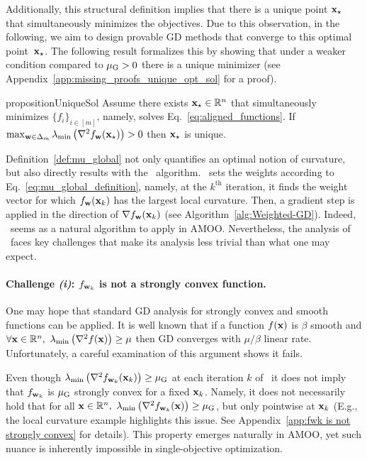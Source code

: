 Additionally, this structural definition implies that there is a unique point ${\mathbf{x}}_\star$ that simultaneously minimizes the objectives. Due to this observation, in the following, we aim to design provable GD methods that converge to this optimal point~${\mathbf{x}}_\star$. The following result formalizes this by showing that under a weaker condition compared to ${\mu_{\mathrm{G}}}>0$ there is a unique minimizer (see Appendix~\ref{app:missing_proofs_unique_opt_sol}  for a proof).

\begin{restatable}{proposition}{UniqueSol}\label{prop:unique_optimal_sol} Assume there exists ${\mathbf{x}}_\star\in \mathbb{R}^n$ that simultaneously minimizes $\{f_i \}_{i\in [m]}$, namely, solves Eq.~\eqref{eq:aligned_functions}. If $\max_{{\mathbf{w}}\in \Delta_m}\lambda_{\min}\left(\nabla^2 f_{{\mathbf{w}}}({\mathbf{x}}_\star) \right)>0$ then ${\mathbf{x}}_\star$ is unique.
\end{restatable}


Definition~\ref{def:mu_global} not only quantifies an optimal notion of curvature, but also directly results with the \CAMOO\ algorithm. \CAMOO\ sets the weights according to Eq.~\eqref{eq:mu_global_definition}, namely, at the $k^{\mathrm{th}}$ iteration, it finds the weight vector for which $f_{\mathbf{w}}({\mathbf{x}}_k)$ has the largest local curvature. Then, a gradient step is applied in the direction of $\nabla f_{{\mathbf{w}}}({\mathbf{x}}_k)$ (see Algorithm~\ref{alg:Weighted-GD}). Indeed, \CAMOO\ seems as a natural algorithm to apply in AMOO. Nevertheless, the analysis of \CAMOO\ faces key challenges that make its analysis less trivial than what one may expect. 

\paragraph{Challenge \emph{(i)}: $f_{{\mathbf{w}}_k}$ is not a strongly convex function.}  One may hope that standard GD analysis for strongly convex and smooth functions can be applied. It is well known that if a function $f({\mathbf{x}})$ is $\beta$ smooth and $\forall \x\in \mathbb{R}^n,\ \lambda_{\min}\brac{\nabla^2 f(\x)} \geq \mu$ then GD converges with $\mu/\beta$ linear rate. Unfortunately, a careful examination of this argument shows it fails.

Even though $\lambda_{\min}\left(\nabla^2 f_{{\mathbf{w}}_k}({\mathbf{x}}_k)\right)\geq {\mu_{\mathrm{G}}}$ at each iteration $k$ of \CAMOO\ it does not imply that $f_{{\mathbf{w}}_k}$ is ${\mu_{\mathrm{G}}}$ strongly convex for a fixed ${\mathbf{x}}_k$. Namely, it does not necessarily hold that for all ${\mathbf{x}}\in \mathbb{R}^n,\ \lambda_{\min} \left(\nabla^2 f_{{\mathbf{w}}_k}({\mathbf{x}})\right) \geq {\mu_{\mathrm{G}}}$, but only pointwise at ${\mathbf{x}}_k$ (E.g., the local curvature example highlights this issue. See Appendix~\ref{app:fwk is not strongly convex} for details). This property emerges naturally in AMOO, yet such nuance is inherently impossible in single-objective optimization.

